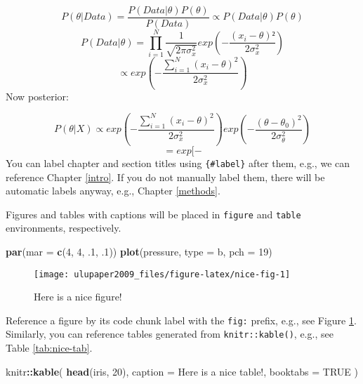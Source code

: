 \documentclass[
]{book}
\newenvironment{Shaded}{\begin{snugshade}}{\end{snugshade}}
\newcommand{\DataTypeTok}[1]{\textcolor[rgb]{0.13,0.29,0.53}{#1}}
\newcommand{\DecValTok}[1]{\textcolor[rgb]{0.00,0.00,0.81}{#1}}
\newcommand{\FloatTok}[1]{\textcolor[rgb]{0.00,0.00,0.81}{#1}}
\newcommand{\KeywordTok}[1]{\textcolor[rgb]{0.13,0.29,0.53}{\textbf{#1}}}
\newcommand{\NormalTok}[1]{#1}
\newcommand{\OperatorTok}[1]{\textcolor[rgb]{0.81,0.36,0.00}{\textbf{#1}}}
\newcommand{\OtherTok}[1]{\textcolor[rgb]{0.56,0.35,0.01}{#1}}
\newcommand{\StringTok}[1]{\textcolor[rgb]{0.31,0.60,0.02}{#1}}
\begin{document}
\[P(\theta | Data) = \frac{P(Data|\theta)P(\theta)}{P(Data)} \propto P(Data|\theta)P(\theta)\]
\[P(Data|\theta) = \prod_{i=1}^{N}\frac{1}{\sqrt{2\pi\sigma_x^2}}exp(-\frac{(x_i-\theta)²}{2\sigma_x^2})\]
\[\propto exp(-\frac{\sum_{i=1}^{N}(x_i-\theta)^2}{2\sigma_x^2})\]
Now posterior:

\[P(\theta|X) \propto  exp(-\frac{\sum_{i=1}^{N}(x_i-\theta)^2}{2\sigma_x^2})exp(-\frac{(\theta-\theta_0)^2}{2\sigma_{\theta}^2})\]
\[=exp[-\]
You can label chapter and section titles using \texttt{\{\#label\}} after them, e.g., we can reference Chapter \ref{intro}. If you do not manually label them, there will be automatic labels anyway, e.g., Chapter \ref{methods}.

Figures and tables with captions will be placed in \texttt{figure} and \texttt{table} environments, respectively.

\begin{Shaded}
\begin{Highlighting}[]
\KeywordTok{par}\NormalTok{(}\DataTypeTok{mar =} \KeywordTok{c}\NormalTok{(}\DecValTok{4}\NormalTok{, }\DecValTok{4}\NormalTok{, }\FloatTok{.1}\NormalTok{, }\FloatTok{.1}\NormalTok{))}
\KeywordTok{plot}\NormalTok{(pressure, }\DataTypeTok{type =} \StringTok{\textquotesingle{}b\textquotesingle{}}\NormalTok{, }\DataTypeTok{pch =} \DecValTok{19}\NormalTok{)}
\end{Highlighting}
\end{Shaded}

\begin{figure}

{\centering \texttt{[image: ulupaper2009\_files/figure-latex/nice-fig-1]} 

}

\caption{Here is a nice figure!}\label{fig:nice-fig}
\end{figure}

Reference a figure by its code chunk label with the \texttt{fig:} prefix, e.g., see Figure \ref{fig:nice-fig}. Similarly, you can reference tables generated from \texttt{knitr::kable()}, e.g., see Table \ref{tab:nice-tab}.

\begin{Shaded}
\begin{Highlighting}[]
\NormalTok{knitr}\OperatorTok{::}\KeywordTok{kable}\NormalTok{(}
  \KeywordTok{head}\NormalTok{(iris, }\DecValTok{20}\NormalTok{), }\DataTypeTok{caption =} \StringTok{\textquotesingle{}Here is a nice table!\textquotesingle{}}\NormalTok{,}
  \DataTypeTok{booktabs =} \OtherTok{TRUE}
\NormalTok{)}
\end{Highlighting}
\end{Shaded}
\end{document}
